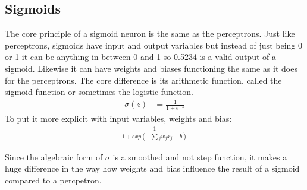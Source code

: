\subsection{Sigmoids}
The core principle of a sigmoid neuron is the same as the perceptrons. Just like perceptrons, sigmoids have input and output variables but
instead of just being 0 or 1 it can be anything in between 0 and 1 so 0.5234 is a valid output of a sigmoid. Likewise it can have weights and
biases functioning the same as it does for the perceptrons.
The core difference is its arithmetic function, called the sigmoid function or sometimes the logistic function.
\begin{equation*}
    \begin{split}
        \sigma(z) & = \frac{1}{1+e^{-z}}
    \end{split}
\end{equation*}
To put it more explicit with input variables, weights and bias:
\begin{equation*}
    \begin{split}
        \frac{1}{1+exp(-\sum{_j}{w_jx_j-b})}
    \end{split}
\end{equation*}
\begin{center}
\end{center}
Since the algebraic form of {$\sigma$} is a smoothed and not step function, it makes a huge difference in the way how weights and bias influence
the result of a sigmoid compared to a percpetron.
\newpage

